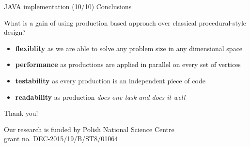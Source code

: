 \documentclass[c]{beamer}
\begin{document}
\begin{frame}{JAVA implementation (10/10) Conclusions}

What is a gain of using production based approach over classical procedural-style design?
\begin{itemize}
  \item \textbf{flexiblity} as we are able to solve any problem size in any dimensional space
  \item \textbf{performance} as productions are applied in parallel on every set of vertices
  \item \textbf{testability} as every production is an independent piece of code
  \item \textbf{readability} as production \textit{does one task and does it well}
\end{itemize}

\end{frame}

\begin{frame}{Thank you!}


Our research is funded by Polish National Science Centre \\ grant no. DEC-2015/19/B/ST8/01064

\end{frame}

\end{document}
